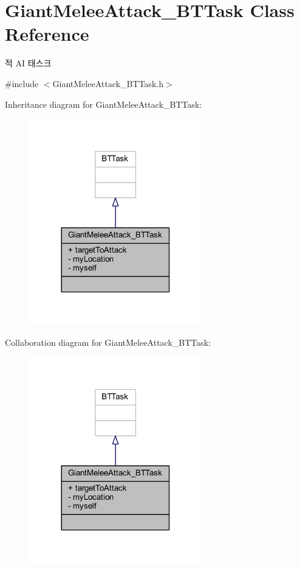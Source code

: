 \hypertarget{class_giant_melee_attack___b_t_task}{}\section{Giant\+Melee\+Attack\+\_\+\+B\+T\+Task Class Reference}
\label{class_giant_melee_attack___b_t_task}


적 AI 태스크  




{\ttfamily \#include $<$Giant\+Melee\+Attack\+\_\+\+B\+T\+Task.\+h$>$}



Inheritance diagram for Giant\+Melee\+Attack\+\_\+\+B\+T\+Task\+:\nopagebreak
\begin{figure}[H]
\begin{center}
\leavevmode
\includegraphics[width=213pt]{class_giant_melee_attack___b_t_task__inherit__graph}
\end{center}
\end{figure}


Collaboration diagram for Giant\+Melee\+Attack\+\_\+\+B\+T\+Task\+:\nopagebreak
\begin{figure}[H]
\begin{center}
\leavevmode
\includegraphics[width=213pt]{class_giant_melee_attack___b_t_task__coll__graph}
\end{center}
\end{figure}
